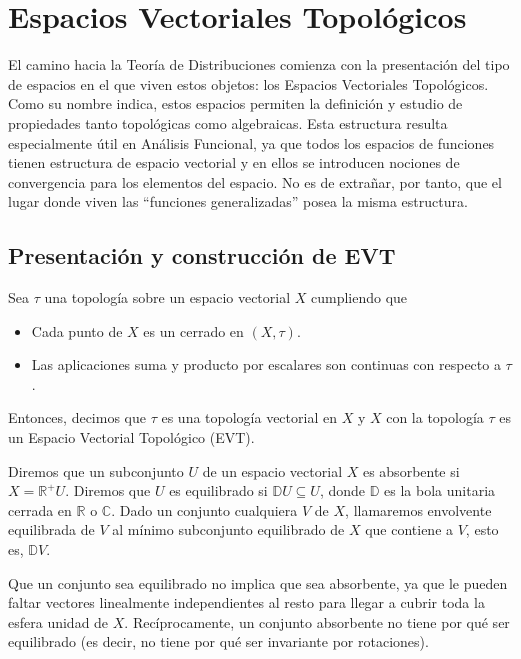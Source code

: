 \chapter{Espacios Vectoriales Topológicos}\label{ch:tercer-capitulo}

El camino hacia la Teoría de Distribuciones comienza con la presentación del tipo de espacios en el que viven estos objetos: los Espacios Vectoriales Topológicos. Como su nombre indica, estos espacios permiten la definición y estudio de propiedades tanto topológicas como algebraicas. Esta estructura resulta especialmente útil en Análisis Funcional, ya que todos los espacios de funciones tienen estructura de espacio vectorial y en ellos se introducen nociones de convergencia para los elementos del espacio. No es de extrañar, por tanto, que el lugar donde viven las ``funciones generalizadas''  posea la misma estructura. 

\section{Presentación y construcción de EVT}

\begin{definicion}
Sea $\tau$ una topología sobre un espacio vectorial $X$ cumpliendo que
 \begin{itemize}
 	\item Cada punto de $X$ es un cerrado en $(X,\tau)$.
 	\item Las aplicaciones suma y producto por escalares son continuas con respecto a $\tau$.
 \end{itemize}
 
 Entonces, decimos que $\tau$ es una topología vectorial en $X$ y $X$ con la topología $\tau$ es un Espacio Vectorial Topológico (EVT).
\end{definicion}


\begin{definicion}
Diremos que un subconjunto $U$ de un espacio vectorial $X$ es absorbente si $X=\mathds{R}^{+}U$. Diremos que $U$ es equilibrado si $\mathds{D}U\subseteq U$, donde $\mathds{D}$ es la bola unitaria cerrada en $ \mathds{R}$  o $\mathds{C}$. Dado un conjunto cualquiera $V$ de $X$, llamaremos envolvente equilibrada de $V$ al mínimo subconjunto equilibrado de $X$ que contiene a $V$, esto es, $\mathds{D}V$.
\end{definicion}
 
\begin{observacion}
Que un conjunto sea equilibrado no implica que sea absorbente, ya que le pueden faltar vectores linealmente independientes al resto para llegar a cubrir toda la esfera unidad de $X$. Recíprocamente, un conjunto absorbente no tiene por qué ser equilibrado (es decir, no tiene por qué ser invariante por rotaciones).
\end{observacion}

